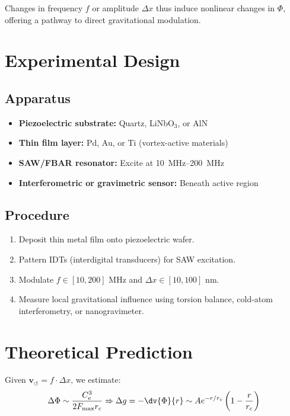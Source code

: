     Changes in frequency \( f \) or amplitude \( \Delta x \) thus induce nonlinear changes in \( \Phi \), offering a pathway to direct gravitational modulation.

    \section*{Experimental Design}
    \subsection*{Apparatus}
    \begin{itemize}
        \item \textbf{Piezoelectric substrate:} Quartz, LiNbO$_3$, or AlN
        \item \textbf{Thin film layer:} Pd, Au, or Ti (vortex-active materials)
        \item \textbf{SAW/FBAR resonator:} Excite at \SI{10}{MHz}--\SI{200}{MHz}
        \item \textbf{Interferometric or gravimetric sensor:} Beneath active region
    \end{itemize}

    \subsection*{Procedure}
    \begin{enumerate}
        \item Deposit thin metal film onto piezoelectric wafer.
        \item Pattern IDTs (interdigital transducers) for SAW excitation.
        \item Modulate \( f \in [10, 200] \) MHz and \( \Delta x \in [10, 100] \) nm.
        \item Measure local gravitational influence using torsion balance, cold-atom interferometry, or nanogravimeter.
    \end{enumerate}

    \section*{Theoretical Prediction}
    Given \( \mathbf{v}_{\scriptscriptstyle\boldsymbol{\circlearrowleft}} = f \cdot \Delta x \), we estimate:
    \begin{equation}
        \Delta \Phi \sim \frac{C_e^3}{2 F_{\text{max}} r_c} \Rightarrow \Delta g = -\dv{\Phi}{r} \sim A e^{-r/r_c} \left(1 - \frac{r}{r_c}\right)
    \end{equation}

